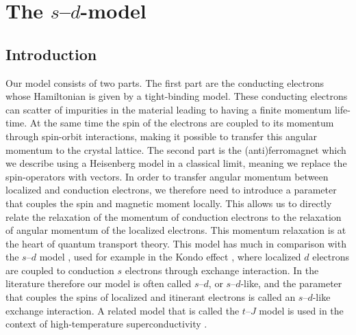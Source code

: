 \chapter{The $s$--$d$-model}\label{ch:sdmodel}
\section{Introduction}
Our model consists of two parts. The first part are the conducting electrons whose Hamiltonian is given by a tight-binding model. These conducting electrons can scatter of impurities in the material leading to having a finite momentum life-time. At the same time the spin of the electrons are coupled to its momentum through spin-orbit interactions, making it possible to transfer this angular momentum to the crystal lattice. The second part is the (anti)ferromagnet which we describe using a Heisenberg model in a classical limit, meaning we replace the spin-operators with vectors. In order to transfer angular momentum between localized and conduction electrons, we therefore need to introduce a parameter that couples the spin and magnetic moment locally. This allows us to directly relate the relaxation of the momentum of conduction electrons to the relaxation of angular momentum of the localized electrons. This momentum relaxation is at the heart of quantum transport theory. This model has much in comparison with the $s$--$d$ model \cite{zener1951interaction,kasuya1956theory,yosida1957magnetic,sdmodel}, used for example in the Kondo effect \cite{10.1143/PTP.32.37}, where localized $d$ electrons are coupled to conduction $s$ electrons through exchange interaction. In the literature therefore our model is often called $s$--$d$, or $s$--$d$-like, and the parameter that couples the spins of localized and itinerant electrons is called an $s$--$d$-like exchange interaction. A related model that is called the $t$--$J$ model is used in the context of high-temperature superconductivity \cite{anderson_resonating_1987, zhang_effective_1988}.

